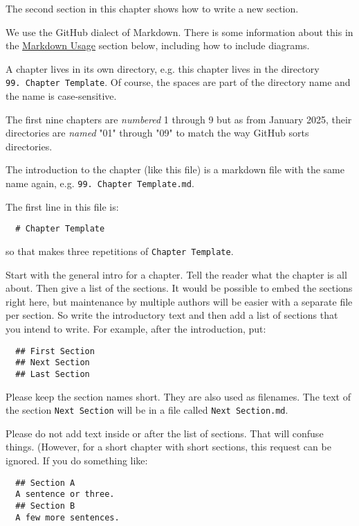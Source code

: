 \documentclass[
]{article}
\begin{document}
The second section in this chapter shows how to write a new section.

We use the GitHub dialect of Markdown. There is some information about
this in the \hyperref[markdown-usage]{Markdown Usage} section below,
including how to include diagrams.

A chapter lives in its own directory, e.g. this chapter lives in the
directory \texttt{99.\ Chapter\ Template}. Of course, the spaces are
part of the directory name and the name is case-sensitive.

The first nine chapters are \emph{numbered} 1 through 9 but as from
January 2025, their directories are \emph{named} "01" through "09" to
match the way GitHub sorts directories.

The introduction to the chapter (like this file) is a markdown file with
the same name again, e.g. \texttt{99.\ Chapter\ Template.md}.

The first line in this file is:

\begin{verbatim}
  # Chapter Template
\end{verbatim}

so that makes three repetitions of \texttt{Chapter\ Template}.

Start with the general intro for a chapter. Tell the reader what the
chapter is all about. Then give a list of the sections. It would be
possible to embed the sections right here, but maintenance by multiple
authors will be easier with a separate file per section. So write the
introductory text and then add a list of sections that you intend to
write. For example, after the introduction, put:

\begin{verbatim}
  ## First Section
  ## Next Section
  ## Last Section
\end{verbatim}

Please keep the section names short. They are also used as filenames.
The text of the section \texttt{Next\ Section} will be in a file called
\texttt{Next\ Section.md}.

Please do not add text inside or after the list of sections. That will
confuse things. (However, for a short chapter with short sections, this
request can be ignored. If you do something like:

\begin{verbatim}
  ## Section A
  A sentence or three.
  ## Section B
  A few more sentences.
\end{verbatim}
\end{document}
